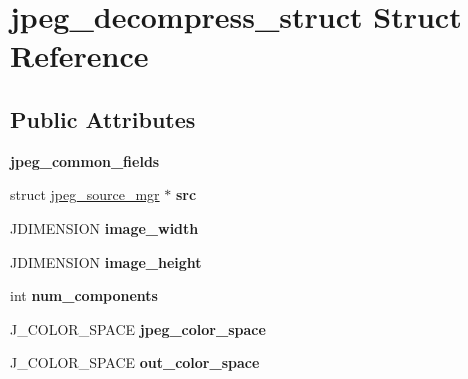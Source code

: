 \hypertarget{structjpeg__decompress__struct}{}\section{jpeg\+\_\+decompress\+\_\+struct Struct Reference}
\label{structjpeg__decompress__struct}
\subsection*{Public Attributes}
\begin{DoxyCompactItemize}
\item 
{\bfseries jpeg\+\_\+common\+\_\+fields}\hypertarget{structjpeg__decompress__struct_a62d872add9f188d06908d327da2a24fd}{}\label{structjpeg__decompress__struct_a62d872add9f188d06908d327da2a24fd}

\item 
struct \hyperlink{structjpeg__source__mgr}{jpeg\+\_\+source\+\_\+mgr} $\ast$ {\bfseries src}\hypertarget{structjpeg__decompress__struct_aa0f9a673100231cfd81f17b789784785}{}\label{structjpeg__decompress__struct_aa0f9a673100231cfd81f17b789784785}

\item 
J\+D\+I\+M\+E\+N\+S\+I\+ON {\bfseries image\+\_\+width}\hypertarget{structjpeg__decompress__struct_a433c0a54f42dfd3d2977ea967b9a21ee}{}\label{structjpeg__decompress__struct_a433c0a54f42dfd3d2977ea967b9a21ee}

\item 
J\+D\+I\+M\+E\+N\+S\+I\+ON {\bfseries image\+\_\+height}\hypertarget{structjpeg__decompress__struct_ad711fae8063a3e75e3c0cccd8512bedf}{}\label{structjpeg__decompress__struct_ad711fae8063a3e75e3c0cccd8512bedf}

\item 
int {\bfseries num\+\_\+components}\hypertarget{structjpeg__decompress__struct_a15d5e8c34e5c66983eda5c0070f0be95}{}\label{structjpeg__decompress__struct_a15d5e8c34e5c66983eda5c0070f0be95}

\item 
J\+\_\+\+C\+O\+L\+O\+R\+\_\+\+S\+P\+A\+CE {\bfseries jpeg\+\_\+color\+\_\+space}\hypertarget{structjpeg__decompress__struct_a980b92cd751cbc72cc7edd1f9ef2c3e4}{}\label{structjpeg__decompress__struct_a980b92cd751cbc72cc7edd1f9ef2c3e4}

\item 
J\+\_\+\+C\+O\+L\+O\+R\+\_\+\+S\+P\+A\+CE {\bfseries out\+\_\+color\+\_\+space}\hypertarget{structjpeg__decompress__struct_a4e69e870df7b81671043374d01efc14f}{}\label{structjpeg__decompress__struct_a4e69e870df7b81671043374d01efc14f}


\end{DoxyCompactItemize}

